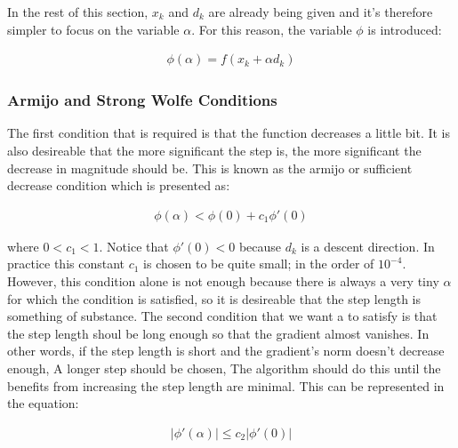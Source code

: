 In the rest of this section, $x_k$ and $d_k$ are already being given and it's therefore simpler to focus on the variable $\alpha$.  For this reason, the variable $\phi$ is introduced:

\begin{equation}
  \begin{aligned}
    \phi(\alpha) = f(x_k + \alpha d_k)
  \end{aligned}
\end{equation}

\subsubsection{Armijo and Strong Wolfe Conditions}

The first condition that is required is that the function decreases a little bit.  It is also desireable that the more significant the step is, the more significant the decrease in magnitude should be.  This is known as the armijo or sufficient decrease condition which is presented as:

\begin{equation} \label{armijo}
  \begin{aligned}
    \phi (\alpha) < \phi(0) + c_1 \phi'(0)
  \end{aligned}
\end{equation}

where $0  < c_1 < 1$.  Notice that $\phi'(0) < 0$ because $d_k$ is a descent direction.  In practice this constant $c_1$ is chosen to be quite small;  in the order of $10^{-4}$.  However, this condition alone is not enough because there is always a very tiny $\alpha$ for which the condition is satisfied,  so it is desireable that the step length is something of substance.  The second condition that we want a  to satisfy is that the step length shoul be long enough so that the gradient almost vanishes.  In other words, if the step length is short and the gradient's norm doesn't decrease enough, A longer step should be chosen,  The algorithm should do this until the benefits from increasing the step length are minimal.  This can be represented in the equation:

\begin{equation} \label{strongWolfe}
  \begin{aligned}
    |\phi'(\alpha)| \leq c_2|\phi'(0)| 
  \end{aligned}
\end{equation}

